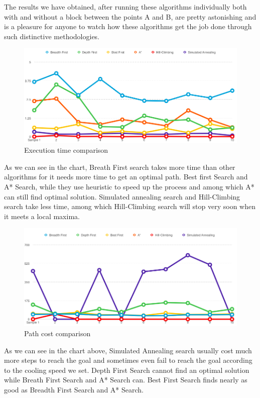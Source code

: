 \documentclass[a4paper]{article}
\begin{document}
The results we have obtained, after running these algorithms individually both with and without a block between the points A and B, are pretty astonishing and is a pleasure for anyone to watch how these algorithms get the job done through such distinctive methodologies.\\

\begin{figure}[h!]
  \centering
    \includegraphics[scale=.4]{images/execution_time.png}
  \caption{Execution time comparison}
\end{figure}

As we can see in the chart, Breath First search takes more time than other algorithms for it needs more time to get an optimal path. Best first Search and A* Search, while they use heuristic to speed up the process and among which A* can still find optimal solution. Simulated annealing search and Hill-Climbing search take less time, among which Hill-Climbing search will stop very soon when it meets a local maxima. \\

\begin{figure}[h!]
  \centering
    \includegraphics[scale=.4]{images/path_cost.png}
  \caption{Path cost comparison}
\end{figure}

As we can see in the chart above, Simulated Annealing search usually cost much more steps to reach the goal and sometimes even fail to reach the goal according to the cooling speed we set. Depth First Search cannot find an optimal solution while Breath First Search and A* Search can. Best First Search finds nearly as good as Breadth First Search and A* Search. \\
\end{document}

